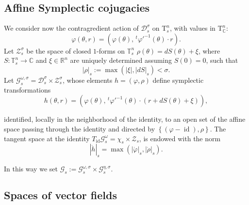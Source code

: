 \documentclass[oneside, 11pt]{amsbook}
\newcommand{\set}[1]{{\left\{#1\right\}}}
\newcommand{\abs}[1]{{\left|#1\right|}}
\newcommand{\normal}{\mathrm}
\newcommand{\G}{\mathcal{G}}
\newcommand{\T}{\mathbb{T}}
\newcommand{\R}{\mathbb{R}}
\newcommand{\C}{\mathbb{C}}
\newcommand{\teta}{\theta}
\newcommand{\id}{\operatorname{id}}
\newcommand{\cG}{{\mathcal G}}
\newcommand{\0}{{(0)}}
\newcommand{\3}{{(3)}}
\numberwithin{equation}{section}
\numberwithin{defn}{section}
\numberwithin{prop}{section}
\numberwithin{cor}{section}
\numberwithin{lemma}{section}
\numberwithin{rmk}{section}
\numberwithin{corollary}{section}
\begin{document}
\subsection{Affine Symplectic cojugacies}\label{hamiltonian conjugacy}

We consider now the contragredient action of $\mathcal{D}^\sigma_s$ on $\normal{T}^n_s$, with values in $\normal{T}^n_\C$: \[\varphi(\teta,r) = (\varphi(\teta), \,^t\varphi'^{-1}(\teta)\cdot r).\] 
Let  $\mathcal{Z}^\sigma_s$ be the space of closed $1$-forms on $\T^n_s$ $\rho(\teta)= dS(\teta) + \xi$, where $S: \T^n_s\to \C $ and $\xi\in\R^n$ are uniquely determined assuming $S(0)=0$, such that $$\abs{\rho}_s := \max (\abs{\xi}, \abs{dS}_s)<\sigma.$$ Let $\G^{\omega,\sigma}_{s}= \mathcal{D}^\sigma_s\times \mathcal{Z}^\sigma_s$, whose elements $h = (\varphi, \rho)$ define symplectic transformations 
\begin{equation}
	h(\teta,r)= (\varphi(\teta),\,^t\varphi'^{-1}(\teta)\cdot (r + dS(\theta) + \xi)),
	\label{symplectic g}
\end{equation}

identified, locally in the neighborhood of the identity, to an open set of the affine space passing through the identity and directed by $\set{(\varphi - \id), \rho}$. 
The tangent space at the identity $T_{\id}\G^{\omega}_s=\chi_s\times\mathcal{Z}_s$,
 is endowed with the norm \[|{\dot h}|_s = \max(\abs{\dot\varphi}_s,\abs{\dot\rho}_s).\] 

\medskip

In this way we set $\cG_s := \cG^{\omega,\sigma}_s\times \cG^{\eta,\sigma}_s$.

\subsection{Spaces of vector fields} \label{Spaces of vector fields}
\end{document}
